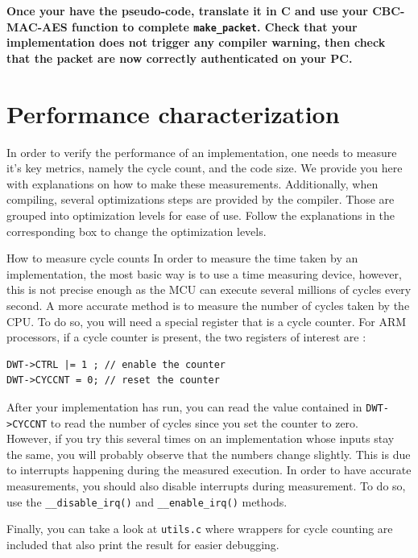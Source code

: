 \textbf{
    Once your have the pseudo-code, translate it in C and use your CBC-MAC-AES
    function to complete \texttt{make\_packet}.
    Check that your implementation does not trigger any compiler warning, then
    check that the packet are now correctly authenticated on your PC.
}

\section{Performance characterization}
In order to verify the performance of an implementation, one needs to measure it's key metrics, namely the cycle count, and the code size. We provide you here with explanations on how to make these measurements. Additionally, when compiling, several optimizations steps are provided by the compiler. Those are grouped into optimization levels for ease of use. Follow the explanations in the corresponding box to change the optimization levels.


\begin{bclogo}[couleur = gray!20, arrondi = 0.2, logo=\bcinfo]{How to measure cycle counts} In order to measure the time taken by an implementation, the most basic way is to use a time measuring device, however, this is not precise enough as the MCU can execute several millions of cycles every second. A more accurate method is to measure the number of cycles taken by the CPU. To do so, you will need a special register that is a cycle counter. For ARM processors, if a cycle counter is present, the two registers of interest are :
\begin{lstlisting}[style=customc]
DWT->CTRL |= 1 ; // enable the counter
DWT->CYCCNT = 0; // reset the counter
\end{lstlisting}
After your implementation has run, you can read the value contained in \texttt{DWT->CYCCNT} to read the number of cycles since you set the counter to zero.\\

However, if you try this several times on an implementation whose inputs stay the same, you will probably observe that the numbers change slightly. This is due to interrupts happening during the measured execution. In order to have accurate measurements, you should also disable interrupts during measurement. To do so, use the  \texttt{\_\_disable\_irq()} and \texttt{\_\_enable\_irq()} methods.

Finally, you can take a look at \texttt{utils.c} where wrappers for cycle counting are included that also print the result for easier debugging.
\end{bclogo}



